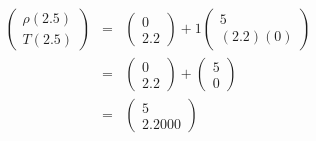 \documentclass[12pt]{article}
\begin{document}
\begin{enumerate}[leftmargin=*,widest=9]
\begin{eqnarray*}
    	\begin{pmatrix}
			\rho(2.5) \\ T(2.5)
		\end{pmatrix}
    &=& \begin{pmatrix}
    0 \\ 2.2
    \end{pmatrix} + 1 \begin{pmatrix}
    5 \\ (2.2)(0)
    \end{pmatrix} \\
     &=& \begin{pmatrix}
    0 \\ 2.2
    \end{pmatrix} + \begin{pmatrix}
    5 \\ 0
    \end{pmatrix} \\
   	&=& \begin{pmatrix}
    5 \\ 2.2000
    \end{pmatrix}
    \end{eqnarray*}
\end{enumerate}
\end{document}
